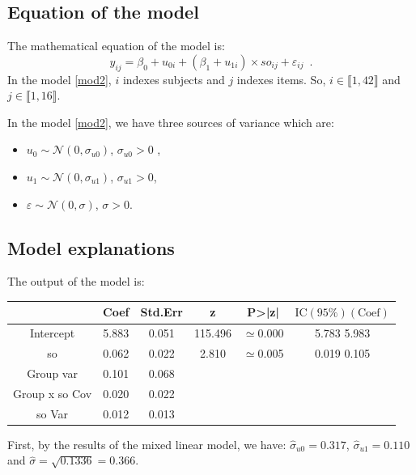 \documentclass{article}
\begin{document}
\subsection{Equation of the model}
The mathematical equation of the model is:
\begin{equation}\label{mod2}
    y_{ij}= \beta_0 + u_{0i} + (\beta_1 + u_{1i}) \times so_{ij} + \varepsilon_{ij} \enspace.
\end{equation}
In the model \eqref{mod2}, $i$ indexes subjects and $j$ indexes items. So, $i \in \llbracket1,42\rrbracket $ and $j \in \llbracket1,16\rrbracket$.

In the model \eqref{mod2}, we have three sources of variance which are:
\begin{itemize}
    \item $u_0 \sim \mathcal{N}(0,\sigma_{u0})$, $\sigma_{u0}>0$ \enspace,
    \item $u_1 \sim \mathcal{N}(0,\sigma_{u1})$, $\sigma_{u1}>0$\enspace,
    \item $\varepsilon \sim \mathcal{N}(0, \sigma)$, $\sigma>0$\enspace.
\end{itemize}

\subsection{Model explanations}
The output of the model is:
\begin{center}
    \begin{tabular}{|c|c|c|c|c|c|}
    \hline
         & Coef & Std.Err & z & P>|z| & $\text{IC}(95\%)(\text{Coef})$  \\
         \hline \hline
        Intercept & 5.883 & 0.051 & 115.496 & $\simeq$0.000 & 5.783 5.983\\
         so & 0.062 & 0.022 & 2.810 & $\simeq$0.005 & 0.019 0.105 \\
         Group var &  0.101 & 0.068 &  & & \\
         Group x so Cov & 0.020 & 0.022 & & &\\
         so Var & 0.012 & 0.013 & & &\\
         \hline
    \end{tabular}
\end{center}

First, by the results of the mixed linear model, we have:
$\hat{\sigma}_{u0}=0.317$, $\hat{\sigma}_{u1}=0.110$ and $\hat{\sigma}=\sqrt{0.1336}=0.366$.
\end{document}
